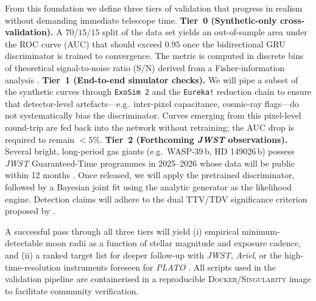 \documentclass[11pt]{article}
\begin{document}
From this foundation we define three tiers of validation that progress in realism without demanding immediate telescope time.  
\textbf{Tier~0 (Synthetic-only cross‐validation).} A $70$/$15$/$15$ split of the data set yields an out-of-sample area under the ROC curve (AUC) that should exceed $0.95$ once the bidirectional GRU discriminator is trained to convergence.  The metric is computed in discrete bins of theoretical signal-to-noise ratio (S/N) derived from a Fisher-information analysis \citep{PriceRogers2014}.  
\textbf{Tier~1 (End-to-end simulator checks).}  We will pipe a subset of the synthetic curves through \texttt{ExoSim~2} \citep{ExoSim2024} and the \texttt{Eureka!} reduction chain \citep{Bell2022} to ensure that detector-level artefacts—e.g.\ inter-pixel capacitance, cosmic-ray flags—do not systematically bias the discriminator.  Curves emerging from this pixel-level round-trip are fed back into the network without retraining; the AUC drop is required to remain $<5\%$.  
\textbf{Tier~2 (Forthcoming \textit{JWST} observations).}  Several bright, long-period gas giants (e.g.\ WASP-39\,b, HD 149026\,b) possess \textit{JWST} Guaranteed-Time programmes in 2025–2026 whose data will be public within 12 months \citep{Rustamkulov2024}.  Once released, we will apply the pretrained discriminator, followed by a Bayesian joint fit using the analytic generator as the likelihood engine.  Detection claims will adhere to the dual TTV/TDV significance criterion proposed by \citet{Heller2014}.  

A successful pass through all three tiers will yield (i) empirical minimum-detectable moon radii as a function of stellar magnitude and exposure cadence, and (ii) a ranked target list for deeper follow-up with \textit{JWST}, \textit{Ariel}, or the high-time-resolution instruments foreseen for \textit{PLATO} \citep{PLATOObjectives2018}.  All scripts used in the validation pipeline are containerised in a reproducible \textsc{Docker}/\textsc{Singularity} image to facilitate community verification.

\end{document}

